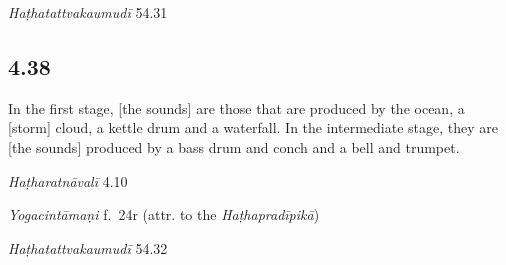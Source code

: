 \begin{ekdosis}
\begin{testimonia}[hp04_037]
\emph{Haṭhatattvakaumudī} 54.31
\begin{versinnote}
\end{versinnote}
\end{testimonia}


\subsection*{4.38}
\begin{translation}[hp04_038]
In the first stage, [the sounds] are those that are produced by the ocean, a [storm] cloud, a kettle drum and a waterfall. In the intermediate stage, they are [the sounds] produced by a bass drum and conch and a bell and trumpet.
\end{translation}


\begin{testimonia}[hp04_038]
\emph{Haṭharatnāvalī} 4.10
\begin{versinnote}
\end{versinnote}

\emph{Yogacintāmaṇi} f.~24r (attr. to the \emph{Haṭhapradīpikā})
\begin{versinnote}
\end{versinnote}    

\emph{Haṭhatattvakaumudī} 54.32
\begin{versinnote}
\end{versinnote}
\end{testimonia}


\end{ekdosis}
